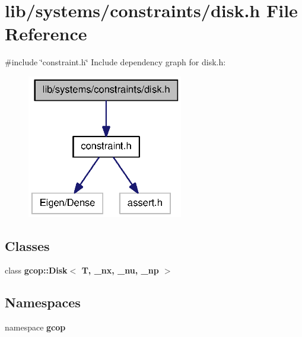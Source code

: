 \section{lib/systems/constraints/disk.h \-File \-Reference}
\label{disk_8h}
{\ttfamily \#include \char`\"{}constraint.\-h\char`\"{}}\*
\-Include dependency graph for disk.\-h\-:
\nopagebreak
\begin{figure}[H]
\begin{center}
\leavevmode
\includegraphics[width=193pt]{disk_8h__incl}
\end{center}
\end{figure}
\subsection*{\-Classes}
\begin{DoxyCompactItemize}
\item 
class {\bf gcop\-::\-Disk$<$ T, \-\_\-nx, \-\_\-nu, \-\_\-np $>$}
\end{DoxyCompactItemize}
\subsection*{\-Namespaces}
\begin{DoxyCompactItemize}
\item 
namespace {\bf gcop}
\end{DoxyCompactItemize}
